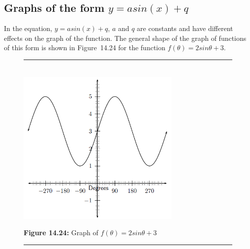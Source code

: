 \subsection*{Graphs of the form $y=asin(x)+q$}
\nopagebreak
In the equation, $y=asin(x)+q$, $a$ and $q$ are constants and have different effects on the graph of the function. The general shape of the graph of functions of this form is shown in Figure~14.24 for the function $f(\theta )=2sin\theta +3$.\par 
\setcounter{subfigure}{0}
\begin{figure}[H] %
\begin{center}
\rule[.1in]{\figurerulewidth}{.005in} \\
\label{m39414*uid33!!!underscore!!!media}\label{m39414*uid33!!!underscore!!!printimage}\includegraphics[width=300px]{col11306.imgs/m39414_trigrep.png} %
\vspace{2pt}
\vspace{\rubberspace}\par \begin{cnxcaption}
\small \textbf{Figure 14.24: }Graph of $f(\theta )=2sin\theta +3$
\end{cnxcaption}
\vspace{.1in}
\rule[.1in]{\figurerulewidth}{.005in} \\
\end{center}
\end{figure}       

